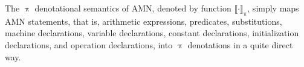 \documentclass[a4paper,openany]{book}
\begin{document}

\newcommand{\PIDEN}[1]{\llbracket #1 \rrbracket_\uppi}

The $\uppi$ denotational semantics of AMN, denoted by function $\llbracket\cdot\rrbracket_\uppi$, simply maps AMN statements, that is, arithmetic expressions, predicates, substitutions, machine  declarations, variable declarations, constant declarations, initialization declarations, and operation declarations, into $\uppi$ denotations in a quite direct way.
\end{document}
